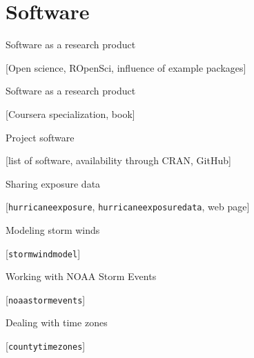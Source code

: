 \documentclass[ignorenonframetext,]{beamer}
\begin{document}
\section{Software}\label{software}

\begin{frame}{Software as a research product}

{[}Open science, ROpenSci, influence of example packages{]}

\end{frame}

\begin{frame}{Software as a research product}

{[}Coursera specialization, book{]}

\end{frame}

\begin{frame}{Project software}

{[}list of software, availability through CRAN, GitHub{]}

\end{frame}

\begin{frame}[fragile]{Sharing exposure data}

{[}\texttt{hurricaneexposure}, \texttt{hurricaneexposuredata}, web
page{]}

\end{frame}

\begin{frame}[fragile]{Modeling storm winds}

{[}\texttt{stormwindmodel}{]}

\end{frame}

\begin{frame}[fragile]{Working with NOAA Storm Events}

{[}\texttt{noaastormevents}{]}

\end{frame}

\begin{frame}[fragile]{Dealing with time zones}

{[}\texttt{countytimezones}{]}

\end{frame}
\end{document}
